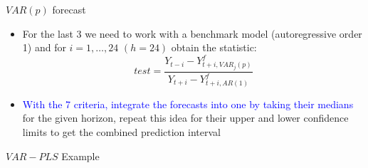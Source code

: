 \documentclass{beamer}
\newcommand{\?}{?`}
\begin{document}
\begin{frame}{$VAR(p)$ forecast}
  \begin{itemize}
  \item For the last 3 we need to work with a benchmark model (autoregressive order 1) and for $i=1,\ldots,24$ $(h = 24)$ obtain the statistic:
      \begin{displaymath}
      test=\frac{Y_{t-i}-Y_{t+i,VAR_j(p)}^f}{Y_{t+i}-Y_{t+i,AR(1)}^f}
    \end{displaymath}
  \item \textcolor{blue}{With the 7 criteria, integrate the forecasts into one by taking their medians} for the given horizon, repeat this idea
  for their upper and lower confidence limits  to get the combined prediction interval
  \end{itemize}
\end{frame}



\begin{frame}{$VAR-PLS$ Example}
  \begin{figure}[htbp]
  \end{figure}
\end{frame}
\end{document}
